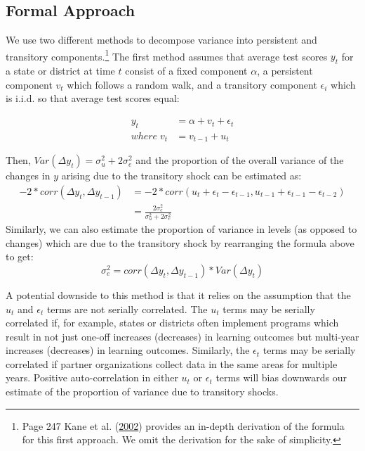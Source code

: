 \documentclass[
  11pt,
]{article}
\begin{document}
\hypertarget{formal-approach}{%
\subsection{Formal Approach}\label{formal-approach}}

We use two different methods to decompose variance into persistent and transitory components.\footnote{Page 247 Kane et al. (\protect\hyperlink{ref-kane2002volatility}{2002}) provides an in-depth derivation of the formula for this first approach. We omit the derivation for the sake of simplicity.} The first method assumes that average test scores \(y_{t}\) for a state or district at time \({t}\) consist of a fixed component \(\alpha\), a persistent component \(v_{t}\) which follows a random walk, and a transitory component \(\epsilon_{i}\) which is i.i.d. so that average test scores equal:

\[ 
\begin{aligned}
y_{t} &= \alpha + v_{t} + \epsilon_{t} \\
where \; v_{t} &= v_{t-1} + u_{t}
\end{aligned}
\]

Then, \(Var(\Delta y_{t}) = \sigma^2_{u} + 2\sigma^2_{e}\) and the proportion of the overall variance of the changes in \(y\) arising due to the transitory shock can be estimated as:
\[
\begin{aligned}
  -2*corr(\Delta y_{t}, \Delta y_{t-1}) &= 
  -2*corr(u_{t} + \epsilon_{t} - \epsilon_{t-1},u_{t-1} + \epsilon_{t-1} - \epsilon_{t-2}) \\
  &= \frac{2\sigma^2_{e}}{\sigma^2_{u} + 2\sigma^2_{e}}
\end{aligned}
\]
Similarly, we can also estimate the proportion of variance in levels (as opposed to changes) which are due to the transitory shock by rearranging the formula above to get:
\[
\sigma^2_{e} = corr(\Delta y_{t}, \Delta y_{t-1}) *Var(\Delta y_{t})
\]

A potential downside to this method is that it relies on the assumption that the \(u_{t}\) and \(\epsilon_{t}\) terms are not serially correlated. The \(u_{t}\) terms may be serially correlated if, for example, states or districts often implement programs which result in not just one-off increases (decreases) in learning outcomes but multi-year increases (decreases) in learning outcomes. Similarly, the \(\epsilon_{t}\) terms may be serially correlated if partner organizations collect data in the same areas for multiple years. Positive auto-correlation in either \(u_{t}\) or \(\epsilon_{t}\) terms will bias downwards our estimate of the proportion of variance due to transitory shocks.
\end{document}
